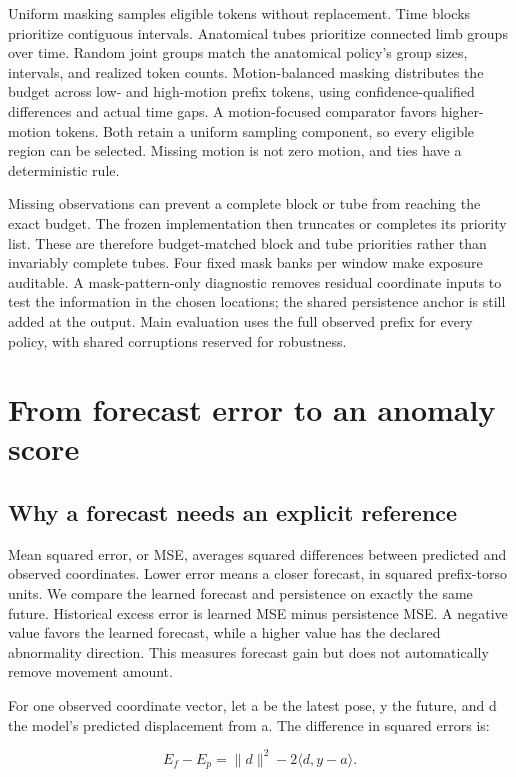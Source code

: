 \documentclass[letterpaper]{article}
\begin{document}
Uniform masking samples eligible tokens without replacement. Time blocks prioritize contiguous intervals. Anatomical tubes prioritize connected limb groups over time. Random joint groups match the anatomical policy's group sizes, intervals, and realized token counts. Motion-balanced masking distributes the budget across low- and high-motion prefix tokens, using confidence-qualified differences and actual time gaps. A motion-focused comparator favors higher-motion tokens. Both retain a uniform sampling component, so every eligible region can be selected. Missing motion is not zero motion, and ties have a deterministic rule.

Missing observations can prevent a complete block or tube from reaching the exact budget. The frozen implementation then truncates or completes its priority list. These are therefore budget-matched block and tube priorities rather than invariably complete tubes. Four fixed mask banks per window make exposure auditable. A mask-pattern-only diagnostic removes residual coordinate inputs to test the information in the chosen locations; the shared persistence anchor is still added at the output. Main evaluation uses the full observed prefix for every policy, with shared corruptions reserved for robustness.

\section{From forecast error to an anomaly score}

\subsection{Why a forecast needs an explicit reference}

Mean squared error, or MSE, averages squared differences between predicted and observed coordinates. Lower error means a closer forecast, in squared prefix-torso units. We compare the learned forecast and persistence on exactly the same future. Historical excess error is learned MSE minus persistence MSE. A negative value favors the learned forecast, while a higher value has the declared abnormality direction. This measures forecast gain but does not automatically remove movement amount.

For one observed coordinate vector, let a be the latest pose, y the future, and d the model's predicted displacement from a. The difference in squared errors is:

\begin{equation}E_f-E_p=\lVert d\rVert^2-2\langle d,y-a\rangle.\end{equation}
\end{document}

